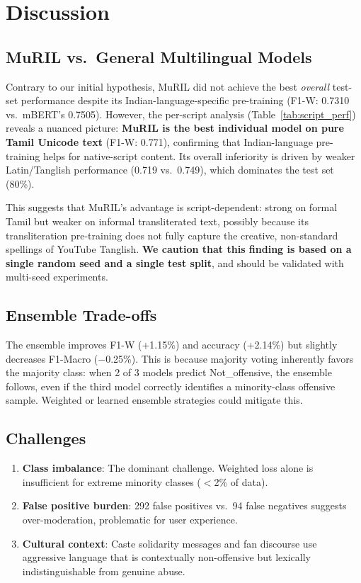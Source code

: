 \documentclass[conference]{IEEEtran}
\begin{document}
\section{Discussion}

\subsection{MuRIL vs.\ General Multilingual Models}

Contrary to our initial hypothesis, MuRIL did not achieve the best \textit{overall} test-set performance despite its Indian-language-specific pre-training (F1-W: 0.7310 vs.\ mBERT's 0.7505). However, the per-script analysis (Table~\ref{tab:script_perf}) reveals a nuanced picture: \textbf{MuRIL is the best individual model on pure Tamil Unicode text} (F1-W: 0.771), confirming that Indian-language pre-training helps for native-script content. Its overall inferiority is driven by weaker Latin/Tanglish performance (0.719 vs.\ 0.749), which dominates the test set (80\%).

This suggests that MuRIL's advantage is script-dependent: strong on formal Tamil but weaker on informal transliterated text, possibly because its transliteration pre-training does not fully capture the creative, non-standard spellings of YouTube Tanglish. \textbf{We caution that this finding is based on a single random seed and a single test split}, and should be validated with multi-seed experiments.

\subsection{Ensemble Trade-offs}

The ensemble improves F1-W (+1.15\%) and accuracy (+2.14\%) but slightly decreases F1-Macro ($-$0.25\%). This is because majority voting inherently favors the majority class: when 2 of 3 models predict Not\_offensive, the ensemble follows, even if the third model correctly identifies a minority-class offensive sample. Weighted or learned ensemble strategies could mitigate this.

\subsection{Challenges}

\begin{enumerate}
    \item \textbf{Class imbalance}: The dominant challenge. Weighted loss alone is insufficient for extreme minority classes ($<$2\% of data).
    \item \textbf{False positive burden}: 292 false positives vs.\ 94 false negatives suggests over-moderation, problematic for user experience.
    \item \textbf{Cultural context}: Caste solidarity messages and fan discourse use aggressive language that is contextually non-offensive but lexically indistinguishable from genuine abuse.
\end{enumerate}
\end{document}
